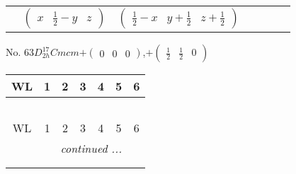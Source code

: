 \documentclass[fleqn,9pt,landscape]{jsarticle}
\begin{document}
\begin{center}
\begin{longtable}{ccccccc}
& $ \begin{pmatrix} x & \frac{1}{2} - y & z \end{pmatrix} $ & $ \begin{pmatrix} \frac{1}{2} - x & y + \frac{1}{2} & z + \frac{1}{2} \end{pmatrix} $ & $  $ & $  $ & $  $ & $  $ \\
\end{longtable}
\end{center}
\newpage
No. 63\quad$D_{2h}^{17}$\quad$Cmcm$\quad[ orthorhombic ]\quad$+\begin{pmatrix} 0 & 0 & 0 \end{pmatrix}$,\quad $+\begin{pmatrix} \frac{1}{2} & \frac{1}{2} & 0 \end{pmatrix}$
\begin{center}
\renewcommand{\arraystretch}{1.2}
\begin{longtable}{ccccccc}
 \hline \hline
WL & 1 & 2 & 3 & 4 & 5 & 6 \\ \hline \endfirsthead

\multicolumn{6}{l}{\tablename\ \thetable{}} \\
 \hline \hline
WL & 1 & 2 & 3 & 4 & 5 & 6 \\ \hline \endhead

 \hline \hline
\multicolumn{6}{r}{\footnotesize\it continued ...} \\ \endfoot

 \hline \hline
\multicolumn{6}{r}{} \\ \endlastfoot


\end{longtable}
\end{center}
\end{document}
